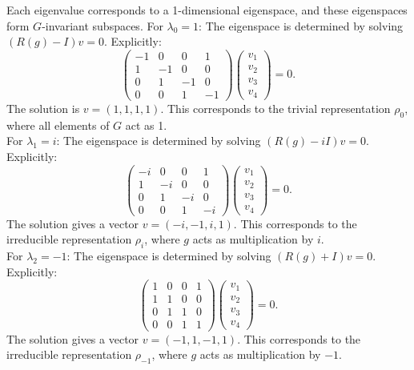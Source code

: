 \documentclass[12pt, letterpaper]{article}
\theoremstyle{definition}
\begin{document}
\begin{enumerate}[(a)]
Each eigenvalue corresponds to a 1-dimensional eigenspace, and these eigenspaces form \( G \)-invariant subspaces.
For \( \lambda_0 = 1 \):
The eigenspace is determined by solving \( (R(g) - I)v = 0 \). Explicitly:
\[
\begin{pmatrix}
-1 & 0 & 0 & 1 \\
1 & -1 & 0 & 0 \\
0 & 1 & -1 & 0 \\
0 & 0 & 1 & -1
\end{pmatrix}
\begin{pmatrix}
v_1 \\ v_2 \\ v_3 \\ v_4
\end{pmatrix}
= 0.
\]
The solution is \( v = (1, 1, 1, 1) \). This corresponds to the trivial representation \( \rho_0 \), where all elements of \( G \) act as 1.\\
For \( \lambda_1 = i \):
The eigenspace is determined by solving \( (R(g) - iI)v = 0 \). Explicitly:
\[
\begin{pmatrix}
-i & 0 & 0 & 1 \\
1 & -i & 0 & 0 \\
0 & 1 & -i & 0 \\
0 & 0 & 1 & -i
\end{pmatrix}
\begin{pmatrix}
v_1 \\ v_2 \\ v_3 \\ v_4
\end{pmatrix}
= 0.
\]
The solution gives a vector \( v = (-i, -1, i, 1) \). This corresponds to the irreducible representation \( \rho_{i} \), where \( g \) acts as multiplication by \( i \).\\
 For \( \lambda_2 = -1 \):
The eigenspace is determined by solving \( (R(g) + I)v = 0 \). Explicitly:
\[
\begin{pmatrix}
1 & 0 & 0 & 1 \\
1 & 1 & 0 & 0 \\
0 & 1 & 1 & 0 \\
0 & 0 & 1 & 1
\end{pmatrix}
\begin{pmatrix}
v_1 \\ v_2 \\ v_3 \\ v_4
\end{pmatrix}
= 0.
\]
The solution gives a vector \( v = (-1, 1, -1, 1) \). This corresponds to the irreducible representation \( \rho_{-1} \), where \( g \) acts as multiplication by \( -1 \).\\

\end{enumerate}
\end{document}

